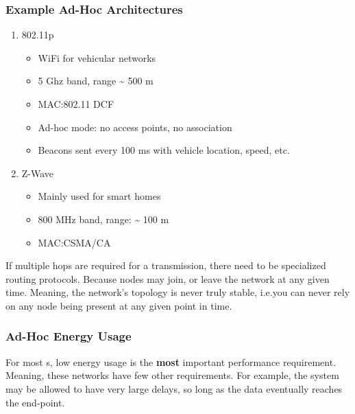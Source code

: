 \subsubsection{Example Ad-Hoc Architectures}\label{subsubsec:Ad_Hoc_Architectures}
\begin{enumerate}[noitemsep]
\item 802.11p
  \begin{itemize}[noitemsep]
  \item WiFi for vehicular networks
  \item 5 Ghz band, range \textasciitilde{} 500 m
  \item MAC:\@ 802.11 DCF
  \item Ad-hoc mode: no access points, no association
  \item Beacons sent every 100 ms with vehicle location, speed, etc.
  \end{itemize}

\item Z-Wave
  \begin{itemize}[noitemsep]
  \item Mainly used for smart homes
  \item 800 MHz band, range: \textasciitilde{} 100 m
  \item MAC:\@ CSMA/CA
  \end{itemize}
\end{enumerate}

\begin{remark*}
  If multiple hops are required for a transmission, there need to be specialized routing protocols.
  Because nodes may join, or leave the network at any given time.
  Meaning, the network's topology is never truly stable, i.e.\@ you can never rely on any node being present at any given point in time.
\end{remark*}

\subsubsection{Ad-Hoc Energy Usage}\label{subsubsec:Ad_Hoc_Architectures}
For most s, low energy usage is the \textbf{most} important performance requirement.
Meaning, these networks have few other requirements.
For example, the system may be allowed to have very large delays, so long as the data eventually reaches the end-point.

